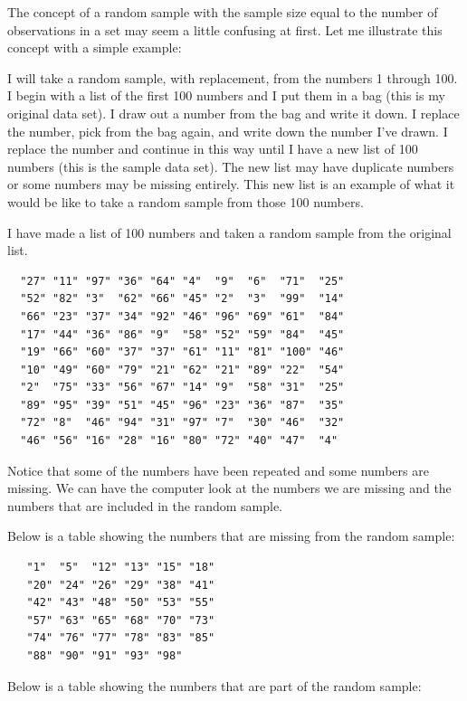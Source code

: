 \documentclass[12pt,twoside]{reedthesis}
\begin{document}
  The concept of a random sample with the sample size equal to the number
  of observations in a set may seem a little confusing at first. Let me
  illustrate this concept with a simple example:
  
  I will take a random sample, with replacement, from the numbers 1
  through 100. I begin with a list of the first 100 numbers and I put them
  in a bag (this is my original data set). I draw out a number from the
  bag and write it down. I replace the number, pick from the bag again,
  and write down the number I've drawn. I replace the number and continue
  in this way until I have a new list of 100 numbers (this is the sample
  data set). The new list may have duplicate numbers or some numbers may
  be missing entirely. This new list is an example of what it would be
  like to take a random sample from those 100 numbers.
  
  I have made a list of 100 numbers and taken a random sample from the
  original list.
  
  \begin{verbatim}
  "27" "11" "97" "36" "64" "4"  "9"  "6"  "71"  "25" 
  "52" "82" "3"  "62" "66" "45" "2"  "3"  "99"  "14" 
  "66" "23" "37" "34" "92" "46" "96" "69" "61"  "84" 
  "17" "44" "36" "86" "9"  "58" "52" "59" "84"  "45" 
  "19" "66" "60" "37" "37" "61" "11" "81" "100" "46" 
  "10" "49" "60" "79" "21" "62" "21" "89" "22"  "54" 
  "2"  "75" "33" "56" "67" "14" "9"  "58" "31"  "25" 
  "89" "95" "39" "51" "45" "96" "23" "36" "87"  "35" 
  "72" "8"  "46" "94" "31" "97" "7"  "30" "46"  "32" 
  "46" "56" "16" "28" "16" "80" "72" "40" "47"  "4"  
  \end{verbatim}
  
  Notice that some of the numbers have been repeated and some numbers are
  missing. We can have the computer look at the numbers we are missing and
  the numbers that are included in the random sample.
  
  \newpage
  
  Below is a table showing the numbers that are missing from the random
  sample:
  
  \begin{verbatim}
   "1"  "5"  "12" "13" "15" "18"
   "20" "24" "26" "29" "38" "41"
   "42" "43" "48" "50" "53" "55"
   "57" "63" "65" "68" "70" "73"
   "74" "76" "77" "78" "83" "85"
   "88" "90" "91" "93" "98" 
  \end{verbatim}
  
  Below is a table showing the numbers that are part of the random sample:
  
\end{document}
